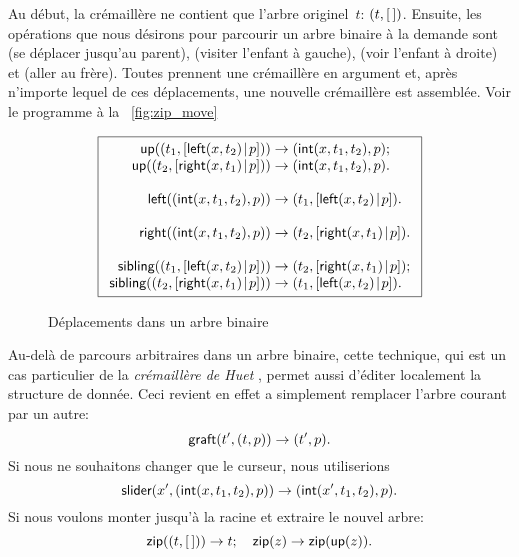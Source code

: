 Au début, la crémaillère ne contient que l'arbre originel~\(t\):
\(({t},{[\,]})\). Ensuite, les opérations que nous désirons pour
parcourir un arbre binaire à la demande sont
 (se déplacer jusqu'au parent),
 (visiter l'enfant à gauche),
 (voir l'enfant à droite) et
 (aller au frère).
Toutes prennent une crémaillère en argument et, après n'importe lequel
de ces déplacements, une nouvelle crémaillère est assemblée. Voir le programme à la
\fig~\vref{fig:zip_move}
\begin{figure}
\begin{equation*}
\boxed{
\begin{array}{r@{\;}c@{\;}l}
\fun{up}(\pair{t_1}{\cons{\fun{left}(x,t_2)}{p}}) & \rightarrow &
  \pair{\fun{int}(x,t_1,t_2)}{p};\\
\fun{up}(\pair{t_2}{\cons{\fun{right}(x,t_1)}{p}}) & \rightarrow &
\pair{\fun{int}(x,t_1,t_2)}{p}.\\
\\
\fun{left}(\pair{\fun{int}(x,t_1,t_2)}{p}) & \rightarrow &
  \pair{t_1}{\cons{\fun{left}(x,t_2)}{p}}.\\
\\
\fun{right}(\pair{\fun{int}(x,t_1,t_2)}{p}) & \rightarrow &
  \pair{t_2}{\cons{\fun{right}(x,t_1)}{p}}.\\
\\
\fun{sibling}(\pair{t_1}{\cons{\fun{left}(x,t_2)}{p}}) & \rightarrow &
  \pair{t_2}{\cons{\fun{right}(x,t_1)}{p}};\\
\fun{sibling}(\pair{t_2}{\cons{\fun{right}(x,t_1)}{p}}) & \rightarrow&
  \pair{t_1}{\cons{\fun{left}(x,t_2)}{p}}.
\end{array}}
\end{equation*}
\caption{Déplacements dans un arbre binaire}
\label{fig:zip_move}
\end{figure}

Au-delà de parcours arbitraires dans un arbre binaire, cette
technique, qui est un cas particulier de la \emph{crémaillère de Huet}
\citep{Huet_1997}, permet aussi d'éditer localement la structure de
donnée.  Ceci revient en effet a simplement remplacer l'arbre courant
par un autre:
\begin{equation*}
\textsf{graft}(t',({t},{p})) \rightarrow ({t'},{p}).
\end{equation*}
Si nous ne souhaitons changer que le curseur, nous utiliserions
\begin{equation*}
\textsf{slider}(x',({\textsf{int}(x,t_1,t_2)},{p})) \rightarrow
({\textsf{int}(x',t_1,t_2)},{p}).
\end{equation*}
Si nous voulons monter jusqu'à la racine et extraire le nouvel arbre:
\begin{equation*}
\textsf{zip}(({t},{[\,]})) \rightarrow t;\quad
\textsf{zip}(z) \rightarrow \textsf{zip}(\textsf{up}(z)).
\end{equation*}

